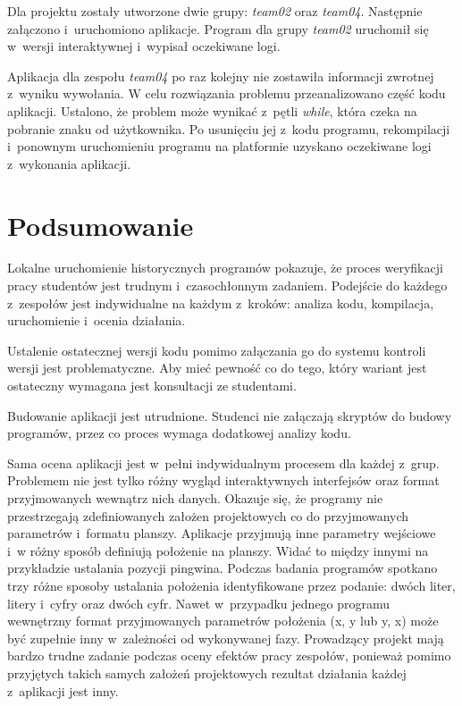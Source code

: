 Dla projektu zostały utworzone dwie grupy:  \textit{team02} oraz \textit{team04}.
Następnie załączono i~uruchomiono aplikacje.
Program dla grupy \textit{team02} uruchomił się w~wersji interaktywnej i~wypisał oczekiwane logi.

Aplikacja dla zespołu \textit{team04} po raz kolejny nie zostawiła informacji zwrotnej z~wyniku wywołania.
W celu rozwiązania problemu przeanalizowano część kodu aplikacji.
Ustalono, że problem może wynikać z~pętli \textit{while}, która czeka na pobranie znaku od użytkownika.
Po usunięciu jej z~kodu programu, rekompilacji i~ponownym uruchomieniu programu na platformie uzyskano oczekiwane logi z~wykonania aplikacji.


\section{Podsumowanie}
\label{verification_summary}

Lokalne uruchomienie historycznych programów pokazuje, że proces weryfikacji pracy studentów jest trudnym i~czasochłonnym zadaniem.
Podejście do każdego z~zespołów jest indywidualne na każdym z~kroków: analiza kodu, kompilacja, uruchomienie i~ocenia działania.

Ustalenie ostatecznej wersji kodu pomimo załączania go do systemu kontroli wersji jest problematyczne.
Aby mieć pewność co do tego, który wariant jest ostateczny wymagana jest konsultacji ze studentami.

Budowanie aplikacji jest utrudnione.
Studenci nie załączają skryptów do budowy programów, przez co proces wymaga dodatkowej analizy kodu.

Sama ocena aplikacji jest w~pełni indywidualnym procesem dla każdej z~grup.
Problemem nie jest tylko różny wygląd interaktywnych interfejsów oraz format przyjmowanych wewnątrz nich danych.
Okazuje się, że programy nie przestrzegają zdefiniowanych założen projektowych co do przyjmowanych parametrów i~formatu planszy.
Aplikacje przyjmują inne parametry wejściowe i~w różny sposób definiują położenie na planszy.
Widać to między innymi na przykładzie ustalania pozycji pingwina.
Podczas badania programów spotkano trzy różne sposoby ustalania położenia identyfikowane przez podanie: dwóch liter, litery i~cyfry oraz dwóch cyfr.
Nawet w~przypadku jednego programu wewnętrzny format przyjmowanych parametrów położenia (x, y lub y, x) może być zupełnie inny w~zależności od wykonywanej fazy.
Prowadzący projekt mają bardzo trudne zadanie podczas oceny efektów pracy zespołów, ponieważ pomimo przyjętych takich samych założeń projektowych rezultat działania każdej z~aplikacji jest inny.

